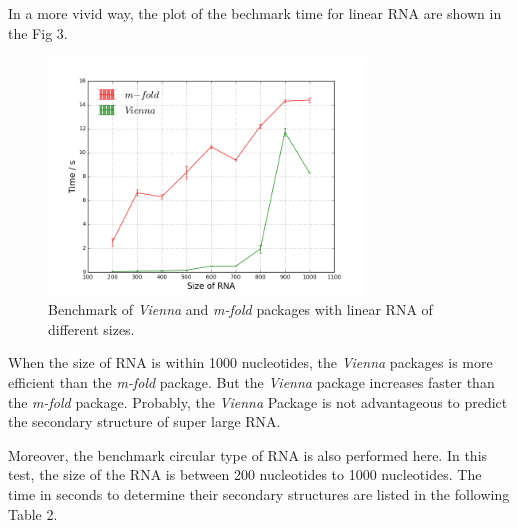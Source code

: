\documentclass[12pt]{article}
\begin{document}
In a more vivid way, the plot of the bechmark time for linear RNA are shown in the Fig 3.\\
\begin{figure}[htbp!]
    \centering
    \includegraphics[width=0.75\textwidth]{l-m-v.png}
    \caption{Benchmark of \textit{Vienna} and \textit{m-fold} packages with linear RNA of different sizes.}
\end{figure}

When the size of RNA is within 1000 nucleotides, the \textit{Vienna} packages is more efficient than the \textit{m-fold} package. But the \textit{Vienna} package increases faster than the \textit{m-fold} package. Probably, the \textit{Vienna} Package is not advantageous to predict the secondary structure of super large RNA.

Moreover, the benchmark circular type of RNA is also performed here. In this test, the size of the RNA is between 200 nucleotides to 1000 nucleotides. The time in seconds to determine their secondary structures are listed in the following Table 2.
\end{document}
